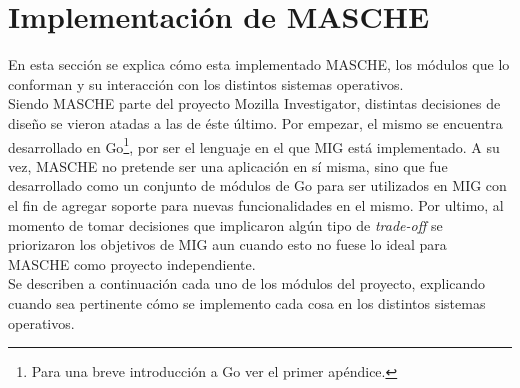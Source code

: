 \section{Implementación de MASCHE}

En esta sección se explica cómo esta implementado MASCHE, los módulos que lo
conforman y su interacción con los distintos sistemas operativos.\\

Siendo MASCHE parte del proyecto Mozilla Investigator, distintas decisiones de
diseño se vieron atadas a las de éste último. Por empezar, el mismo se
encuentra desarrollado en Go\footnote{Para una breve introducción a Go ver el
primer apéndice.}, por ser el lenguaje en el que MIG está implementado. A su
vez, MASCHE no pretende ser una aplicación en sí misma, sino que fue
desarrollado como un conjunto de módulos de Go para ser utilizados en MIG con
el fin de agregar soporte para nuevas funcionalidades en el mismo. Por ultimo,
al momento de tomar decisiones que implicaron algún tipo de \textit{trade-off}
se priorizaron los objetivos de MIG aun cuando esto no fuese lo ideal para
MASCHE como proyecto independiente.\\

Se describen a continuación cada uno de los módulos del proyecto, explicando
cuando sea pertinente cómo se implemento cada cosa en los distintos sistemas
operativos.\\
